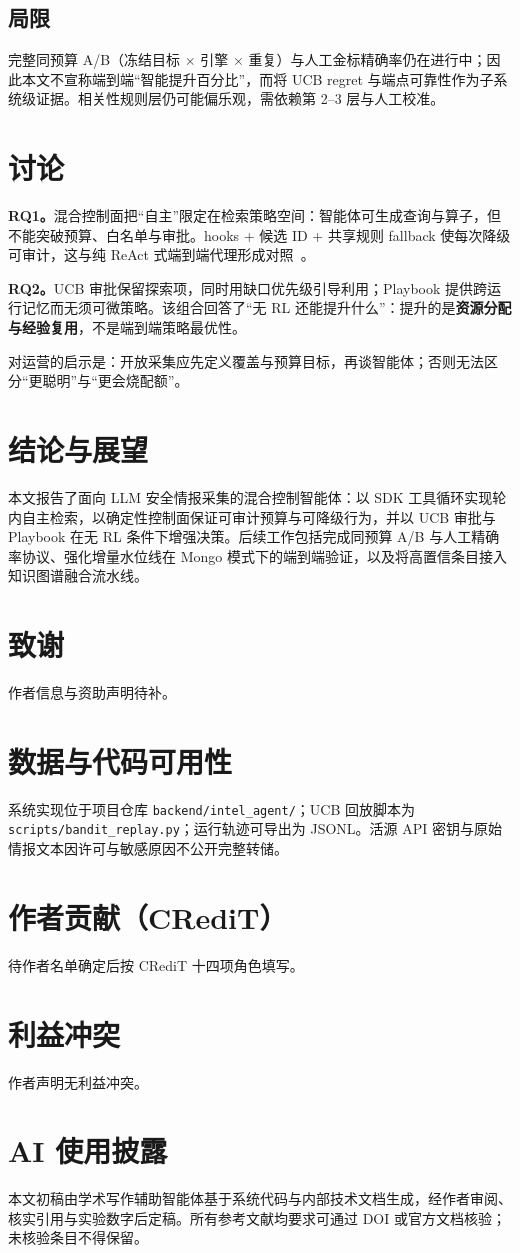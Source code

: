 \documentclass[conference]{IEEEtran}
\begin{document}
\subsection{局限}
完整同预算 A/B（冻结目标 $\times$ 引擎 $\times$ 重复）与人工金标精确率仍在进行中；因此本文不宣称端到端“智能提升百分比”，而将 UCB regret 与端点可靠性作为子系统级证据。相关性规则层仍可能偏乐观，需依赖第 2--3 层与人工校准。

\section{讨论}
\label{sec:discuss}

\textbf{RQ1。}混合控制面把“自主”限定在检索策略空间：智能体可生成查询与算子，但不能突破预算、白名单与审批。hooks + 候选 ID + 共享规则 fallback 使每次降级可审计，这与纯 ReAct 式端到端代理形成对照~\cite{yao2023react}。

\textbf{RQ2。}UCB 审批保留探索项，同时用缺口优先级引导利用；Playbook 提供跨运行记忆而无须可微策略。该组合回答了“无 RL 还能提升什么”：提升的是\textbf{资源分配与经验复用}，不是端到端策略最优性。

对运营的启示是：开放采集应先定义覆盖与预算目标，再谈智能体；否则无法区分“更聪明”与“更会烧配额”。

\section{结论与展望}
\label{sec:concl}

本文报告了面向 LLM 安全情报采集的混合控制智能体：以 SDK 工具循环实现轮内自主检索，以确定性控制面保证可审计预算与可降级行为，并以 UCB 审批与 Playbook 在无 RL 条件下增强决策。后续工作包括完成同预算 A/B 与人工精确率协议、强化增量水位线在 Mongo 模式下的端到端验证，以及将高置信条目接入知识图谱融合流水线。

\section*{致谢}
作者信息与资助声明待补。

\section*{数据与代码可用性}
系统实现位于项目仓库 \texttt{backend/intel\_agent/}；UCB 回放脚本为 \texttt{scripts/bandit\_replay.py}；运行轨迹可导出为 JSONL。活源 API 密钥与原始情报文本因许可与敏感原因不公开完整转储。

\section*{作者贡献（CRediT）}
待作者名单确定后按 CRediT 十四项角色填写。

\section*{利益冲突}
作者声明无利益冲突。

\section*{AI 使用披露}
本文初稿由学术写作辅助智能体基于系统代码与内部技术文档生成，经作者审阅、核实引用与实验数字后定稿。所有参考文献均要求可通过 DOI 或官方文档核验；未核验条目不得保留。



\end{document}
